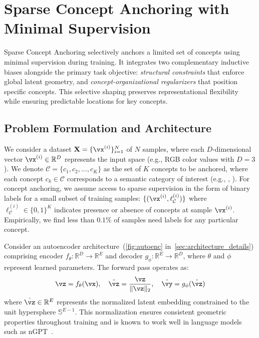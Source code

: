 \section{Sparse Concept Anchoring with Minimal Supervision}
\label{sec:sparse_concept_anchoring}

Sparse Concept Anchoring selectively anchors a limited set of concepts using minimal supervision during training. It integrates two complementary inductive biases alongside the primary task objective: \textit{structural constraints} that enforce global latent geometry, and \textit{concept-organizational regularizers} that position specific concepts. This selective shaping preserves representational flexibility while ensuring predictable locations for key concepts.

%

\subsection{Problem Formulation and Architecture}

We consider a dataset $\mathbf{X} = \{\vx^{(i)}\}_{i=1}^N$ of $N$ samples, where each $D$-dimensional vector $\vx^{(i)} \in \mathbb{R}^D$ represents the input space (e.g., RGB color values with $D=3$). We denote $\mathcal{C} = \{c_1, c_2, \ldots, c_K\}$ as the set of $K$ concepts to be anchored, where each concept $c_k \in \mathcal{C}$ corresponds to a semantic category of interest (e.g., , ). For concept anchoring, we assume access to sparse supervision in the form of binary labels for a small subset of training samples: $\{(\vx^{(i)}, \ell^{(i)}_{\mathcal{C}})\}$ where $\ell^{(i)}_{\mathcal{C}}\in \{0, 1\}^K$ indicates presence or absence of concepts at sample $\vx^{(i)}$. Empirically, we find less than $0.1\%$ of samples need labels for any particular concept.

Consider an autoencoder architecture~(\cref{fig:autoenc} in~\cref{sec:architecture_details}) comprising encoder $f_\theta: \mathbb{R}^D \rightarrow \mathbb{R}^E$ and decoder $g_\phi: \mathbb{R}^E \rightarrow \mathbb{R}^D$, where $\theta$ and $\phi$ represent learned parameters. The forward pass operates as:
\begin{align}
    \vz = f_\theta(\vx), \quad \hat{\vz} = \frac{\vz}{\|\vz\|_2}, \quad \hat{\vy} = g_\phi(\hat{\vz}) \label{eq:forward_pass}
\end{align}
where $\hat{\vz} \in \mathbb{R}^E$ represents the normalized latent embedding constrained to the unit hypersphere $\mathbb{S}^{E-1}$. This normalization ensures consistent geometric properties throughout training and is known to work well in language models such as nGPT~\citep{loshchilov2025ngptnormalizedtransformerrepresentation}.

